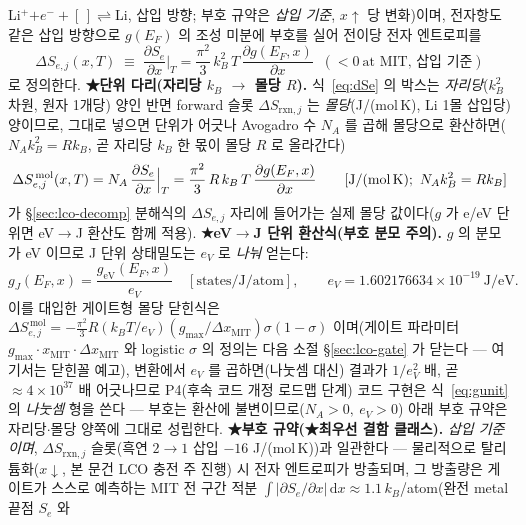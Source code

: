 \documentclass[11pt,a4paper]{article}
\newcommand{\dd}{\mathrm{d}}
\newcommand{\rxn}{\mathrm{rxn}}
\begin{document}
Li$^+$$+e^-+[\,]\rightleftharpoons$Li, 삽입 방향; 부호 규약은 \emph{삽입 기준}, $x\!\uparrow$ 당 변화)이며,
전자항도 같은 삽입 방향으로 $g(E_F)$ 의 조성 미분에 부호를 실어 전이당 전자 엔트로피를
\begin{equation}
\boxed{\;\Delta S_{e,j}(x,T)\;\equiv\;\frac{\partial S_e}{\partial x}\Big|_T
=\frac{\pi^2}{3}\,k_B^2\,T\,\frac{\partial g(E_F,x)}{\partial x}\;\;(<0\ \text{at MIT, 삽입 기준})\;}
\label{eq:dSe}
\end{equation}
로 정의한다. \textbf{★단위 다리(자리당 $k_B$ $\to$ 몰당 $R$).} 식~\eqref{eq:dSe} 의 박스는 \emph{자리당}($k_B^2$ 차원, 원자 1개당) 양인 반면 forward 슬롯
$\Delta S_{\rxn,j}$ 는 \emph{몰당}(J/(mol\,K), Li 1몰 삽입당) 양이므로, 그대로 넣으면 단위가 어긋나 Avogadro 수
$N_A$ 를 곱해 몰당으로 환산하면($N_A k_B^2=R k_B$, 곧 자리당 $k_B$ 한 몫이 몰당 $R$ 로 올라간다)
\begin{equation}
\Delta S_{e,j}^{\,\mathrm{mol}}(x,T)=N_A\,\frac{\partial S_e}{\partial x}\Big|_T
=\frac{\pi^2}{3}\,R\,k_B\,T\,\frac{\partial g(E_F,x)}{\partial x}
\qquad[\text{J/(mol\,K)};\ N_A k_B^2=R k_B]
\label{eq:dSemolar}
\end{equation}
가 \S\ref{sec:lco-decomp} 분해식의 $\Delta S_{e,j}$ 자리에 들어가는 실제 몰당 값이다($g$ 가 e/eV 단위면 eV$\to$J
환산도 함께 적용). \textbf{★eV$\to$J 단위 환산식(부호 분모 주의).} $g$ 의 분모가 eV 이므로 J 단위 상태밀도는 $e_V$ 로 \emph{나눠} 얻는다:
\begin{equation}
g_J(E_F,x)=\frac{g_{\mathrm{eV}}(E_F,x)}{e_V}\quad[\text{states/J/atom}],
\qquad e_V=1.602176634\times10^{-19}\ \text{J/eV}.
\label{eq:gunit}
\end{equation}
이를 대입한 게이트형 몰당 닫힌식은 $\Delta S_{e,j}^{\,\mathrm{mol}}=-\tfrac{\pi^2}{3}R(k_BT/e_V)(g_{\max}/
\Delta x_\mathrm{MIT})\sigma(1-\sigma)$ 이며(게이트 파라미터 $g_{\max}\cdot x_\mathrm{MIT}\cdot\Delta x_\mathrm{MIT}$
와 logistic $\sigma$ 의 정의는 다음 소절 \S\ref{sec:lco-gate} 가 닫는다 — 여기서는 닫힌꼴 예고),
변환에서 $e_V$ 를 곱하면(나눗셈 대신) 결과가 $1/e_V^2$ 배, 곧
$\approx4\times10^{37}$ 배 어긋나므로 P4(후속 코드 개정 로드맵 단계) 코드 구현은 식~\eqref{eq:gunit} 의 \emph{나눗셈} 형을 쓴다 — 부호는
환산에 불변이므로($N_A>0,\ e_V>0$) 아래 부호 규약은 자리당$\cdot$몰당 양쪽에 그대로 성립한다. \textbf{★부호 규약(★최우선 결함 클래스).} \emph{삽입 기준이며}, $\Delta S_{\rxn,j}$ 슬롯(흑연 $2\!\to\!1$ 삽입 $-16$ J/(mol\,K))과 일관한다 — 물리적으로
탈리튬화($x\!\downarrow$, 본 문건 LCO 충전 주 진행) 시 전자 엔트로피가 방출되며, 그 방출량은 게이트가 스스로
예측하는 MIT 전 구간 적분 $\int|\partial S_e/\partial x|\,\dd x\approx1.1\,k_B$/atom(완전 metal 끝점 $S_e$ 와
$$
\end{document}
